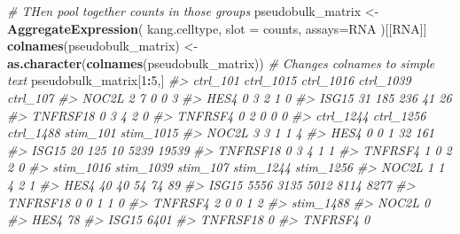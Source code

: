 \documentclass[
]{book}
\newenvironment{Shaded}{\begin{snugshade}}{\end{snugshade}}
\newcommand{\AttributeTok}[1]{\textcolor[rgb]{0.13,0.29,0.53}{#1}}
\newcommand{\CommentTok}[1]{\textcolor[rgb]{0.56,0.35,0.01}{\textit{#1}}}
\newcommand{\DecValTok}[1]{\textcolor[rgb]{0.00,0.00,0.81}{#1}}
\newcommand{\FunctionTok}[1]{\textcolor[rgb]{0.13,0.29,0.53}{\textbf{#1}}}
\newcommand{\NormalTok}[1]{#1}
\newcommand{\OtherTok}[1]{\textcolor[rgb]{0.56,0.35,0.01}{#1}}
\newcommand{\SpecialCharTok}[1]{\textcolor[rgb]{0.81,0.36,0.00}{\textbf{#1}}}
\newcommand{\StringTok}[1]{\textcolor[rgb]{0.31,0.60,0.02}{#1}}
\begin{document}
\begin{Shaded}
\begin{Highlighting}[]
\CommentTok{\# THen pool together counts in those groups}
\NormalTok{pseudobulk\_matrix }\OtherTok{\textless{}{-}} \FunctionTok{AggregateExpression}\NormalTok{( kang.celltype,  }\AttributeTok{slot =} \StringTok{\textquotesingle{}counts\textquotesingle{}}\NormalTok{, }\AttributeTok{assays=}\StringTok{\textquotesingle{}RNA\textquotesingle{}}\NormalTok{ )[[}\StringTok{\textquotesingle{}RNA\textquotesingle{}}\NormalTok{]]}
\FunctionTok{colnames}\NormalTok{(pseudobulk\_matrix) }\OtherTok{\textless{}{-}} \FunctionTok{as.character}\NormalTok{(}\FunctionTok{colnames}\NormalTok{(pseudobulk\_matrix)) }\CommentTok{\# Changes colnames to simple text}
\NormalTok{pseudobulk\_matrix[}\DecValTok{1}\SpecialCharTok{:}\DecValTok{5}\NormalTok{,]}
\CommentTok{\#\textgreater{}          ctrl\_101 ctrl\_1015 ctrl\_1016 ctrl\_1039 ctrl\_107}
\CommentTok{\#\textgreater{} NOC2L           2         7         0         0        3}
\CommentTok{\#\textgreater{} HES4            0         3         2         1        0}
\CommentTok{\#\textgreater{} ISG15          31       185       236        41       26}
\CommentTok{\#\textgreater{} TNFRSF18        0         3         4         2        0}
\CommentTok{\#\textgreater{} TNFRSF4         0         2         0         0        0}
\CommentTok{\#\textgreater{}          ctrl\_1244 ctrl\_1256 ctrl\_1488 stim\_101 stim\_1015}
\CommentTok{\#\textgreater{} NOC2L            3         3         1        1         4}
\CommentTok{\#\textgreater{} HES4             0         0         1       32       161}
\CommentTok{\#\textgreater{} ISG15           20       125        10     5239     19539}
\CommentTok{\#\textgreater{} TNFRSF18         0         3         4        1         1}
\CommentTok{\#\textgreater{} TNFRSF4          1         0         2        2         0}
\CommentTok{\#\textgreater{}          stim\_1016 stim\_1039 stim\_107 stim\_1244 stim\_1256}
\CommentTok{\#\textgreater{} NOC2L            1         1        4         2         1}
\CommentTok{\#\textgreater{} HES4            40        40       54        74        89}
\CommentTok{\#\textgreater{} ISG15         5556      3135     5012      8114      8277}
\CommentTok{\#\textgreater{} TNFRSF18         0         0        1         1         0}
\CommentTok{\#\textgreater{} TNFRSF4          2         0        0         1         2}
\CommentTok{\#\textgreater{}          stim\_1488}
\CommentTok{\#\textgreater{} NOC2L            0}
\CommentTok{\#\textgreater{} HES4            78}
\CommentTok{\#\textgreater{} ISG15         6401}
\CommentTok{\#\textgreater{} TNFRSF18         0}
\CommentTok{\#\textgreater{} TNFRSF4          0}
\end{Highlighting}
\end{Shaded}
\end{document}
